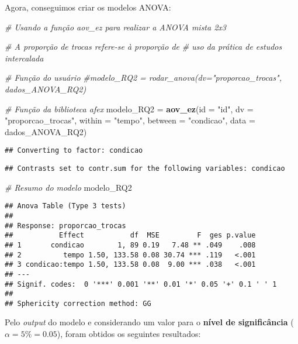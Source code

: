 \documentclass[
]{article}
\newenvironment{Shaded}{\begin{snugshade}}{\end{snugshade}}
\newcommand{\AttributeTok}[1]{\textcolor[rgb]{0.13,0.29,0.53}{#1}}
\newcommand{\CommentTok}[1]{\textcolor[rgb]{0.56,0.35,0.01}{\textit{#1}}}
\newcommand{\FunctionTok}[1]{\textcolor[rgb]{0.13,0.29,0.53}{\textbf{#1}}}
\newcommand{\NormalTok}[1]{#1}
\newcommand{\OtherTok}[1]{\textcolor[rgb]{0.56,0.35,0.01}{#1}}
\newcommand{\StringTok}[1]{\textcolor[rgb]{0.31,0.60,0.02}{#1}}
\begin{document}
Agora, conseguimos criar os modelos ANOVA:

\begin{Shaded}
\begin{Highlighting}[]
\CommentTok{\# Usando a função aov\_ez para realizar a ANOVA mista 2x3}

\CommentTok{\# A proporção de trocas refere{-}se à proporção de}
\CommentTok{\# uso da prática de estudos intercalada}

\CommentTok{\# Função do usuário}
\CommentTok{\#modelo\_RQ2 = rodar\_anova(dv="proporcao\_trocas", dados\_ANOVA\_RQ2)}

\CommentTok{\# Função da biblioteca afex}
\NormalTok{modelo\_RQ2 }\OtherTok{=} \FunctionTok{aov\_ez}\NormalTok{(}\AttributeTok{id =} \StringTok{"id"}\NormalTok{,}
                     \AttributeTok{dv =} \StringTok{"proporcao\_trocas"}\NormalTok{,}
                     \AttributeTok{within =} \StringTok{"tempo"}\NormalTok{,}
                     \AttributeTok{between =} \StringTok{"condicao"}\NormalTok{,}
                     \AttributeTok{data =}\NormalTok{ dados\_ANOVA\_RQ2)}
\end{Highlighting}
\end{Shaded}

\begin{verbatim}
## Converting to factor: condicao
\end{verbatim}

\begin{verbatim}
## Contrasts set to contr.sum for the following variables: condicao
\end{verbatim}

\begin{Shaded}
\begin{Highlighting}[]
\CommentTok{\# Resumo do modelo}
\NormalTok{modelo\_RQ2}
\end{Highlighting}
\end{Shaded}

\begin{verbatim}
## Anova Table (Type 3 tests)
## 
## Response: proporcao_trocas
##           Effect           df  MSE         F  ges p.value
## 1       condicao        1, 89 0.19   7.48 ** .049    .008
## 2          tempo 1.50, 133.58 0.08 30.74 *** .119   <.001
## 3 condicao:tempo 1.50, 133.58 0.08  9.00 *** .038   <.001
## ---
## Signif. codes:  0 '***' 0.001 '**' 0.01 '*' 0.05 '+' 0.1 ' ' 1
## 
## Sphericity correction method: GG
\end{verbatim}

Pelo \emph{output} do modelo e considerando um valor para o
\textbf{nível de significância} (\(\alpha = 5\% = 0.05\)), foram obtidos
os seguintes resultados:
\end{document}
